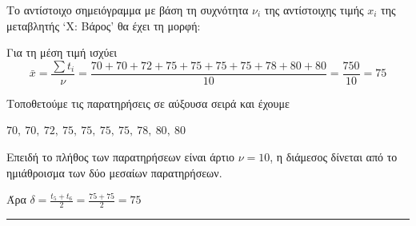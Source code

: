 \begin{alist}
\item Το αντίστοιχο σημειόγραμμα με βάση τη συχνότητα $\nu_i$ της αντίστοιχης τιμής $x_i$ της μεταβλητής ‘Χ: Βάρος’ θα έχει τη μορφή:

\begin{center}
\end{center}

\item 
\begin{rlist}
    \item Για τη μέση τιμή ισχύει
    \[ \bar{x} = \frac{\sum t_i}{\nu} = \frac{70+70+72+75+75+75+75+78+80+80}{10} = \frac{750}{10} = 75 \]
    
    \item Τοποθετούμε τις παρατηρήσεις σε αύξουσα σειρά και έχουμε
    
    $70,\ 70,\ 72,\ 75,\ 75,\ 75,\ 75,\ 78,\ 80,\ 80$
    
    Επειδή το πλήθος των παρατηρήσεων είναι άρτιο $\nu = 10$, η διάμεσος δίνεται από το ημιάθροισμα των δύο μεσαίων παρατηρήσεων.
    
    Άρα $\delta = \frac{t_5 + t_6}{2} = \frac{75+75}{2} = 75$
\end{rlist}
\end{alist}
\vspace{6mm}
\noindent\rule{\textwidth}{0.4pt}
\vspace{6mm}


